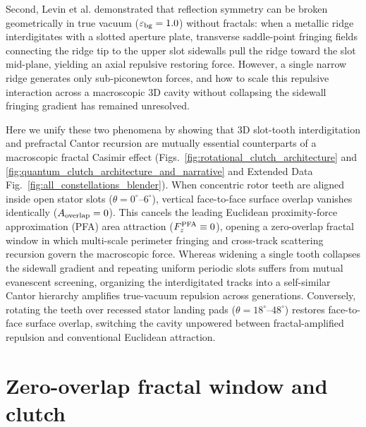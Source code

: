 \documentclass[pdflatex,sn-nature]{sn-jnl}
\begin{document}
Second, Levin et al.\cite{levin2010} demonstrated that reflection symmetry can be broken geometrically in true vacuum ($\varepsilon_{\rm bg}=1.0$) without fractals: when a metallic ridge interdigitates with a slotted aperture plate, transverse saddle-point fringing fields connecting the ridge tip to the upper slot sidewalls pull the ridge toward the slot mid-plane, yielding an axial repulsive restoring force\cite{levin2010,rodriguez2011}. However, a single narrow ridge generates only sub-piconewton forces\cite{levin2010,rodriguez2011}, and how to scale this repulsive interaction across a macroscopic 3D cavity without collapsing the sidewall fringing gradient has remained unresolved.

Here we unify these two phenomena by showing that 3D slot-tooth interdigitation and prefractal Cantor recursion are mutually essential counterparts of a macroscopic fractal Casimir effect (Figs.~\ref{fig:rotational_clutch_architecture} and \ref{fig:quantum_clutch_architecture_and_narrative} and Extended Data Fig.~\ref{fig:all_constellations_blender}). When concentric rotor teeth are aligned inside open stator slots ($\theta = 0^\circ\text{--}6^\circ$), vertical face-to-face surface overlap vanishes identically ($A_{\rm overlap} = 0$). This cancels the leading Euclidean proximity-force approximation (PFA) area attraction ($F_z^{\rm PFA} \equiv 0$), opening a zero-overlap fractal window in which multi-scale perimeter fringing and cross-track scattering recursion govern the macroscopic force. Whereas widening a single tooth collapses the sidewall gradient and repeating uniform periodic slots suffers from mutual evanescent screening, organizing the interdigitated tracks into a self-similar Cantor hierarchy amplifies true-vacuum repulsion across generations. Conversely, rotating the teeth over recessed stator landing pads ($\theta = 18^\circ\text{--}48^\circ$) restores face-to-face surface overlap, switching the cavity unpowered between fractal-amplified repulsion and conventional Euclidean attraction.

\section*{Zero-overlap fractal window and clutch}
\label{sec:architecture}
\end{document}
